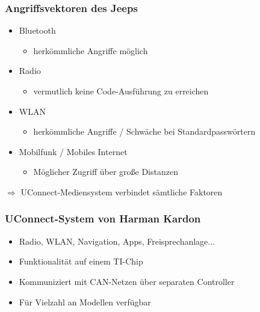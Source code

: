 \documentclass[t]{beamer}
\begin{document}
\begin{frame}
	\frametitle{Angriffsvektoren des Jeeps}
    \begin{itemize}
		\item Bluetooth
        \begin{itemize}
			\item herkömmliche Angriffe möglich
		\end{itemize}

    	\item Radio
        	\begin{itemize}
				\item vermutlich keine Code-Ausführung zu erreichen
			\end{itemize}

        \item WLAN
        	\begin{itemize}
				\item herkömmliche Angriffe / Schwäche bei Standardpasswörtern
			\end{itemize}

        \item Mobilfunk / Mobiles Internet
       		\begin{itemize}
				\item Möglicher Zugriff über große Distanzen
			\end{itemize}
	\end{itemize}
    $\Rightarrow$ UConnect-Mediensystem verbindet sämtliche Faktoren
\end{frame}

\begin{frame}
	\frametitle{UConnect-System von Harman Kardon}
    \begin{itemize}
    	\item Radio, WLAN, Navigation, Apps, Freisprechanlage...
    \end{itemize}
    \begin{itemize}
        \item Funktionalität auf einem TI-Chip
    \end{itemize}
    \begin{itemize}
        \item Kommuniziert mit CAN-Netzen über separaten Controller
    \end{itemize}
    \begin{itemize}
        \item Für Vielzahl an Modellen verfügbar
    \end{itemize}
\end{frame}
\end{document}
